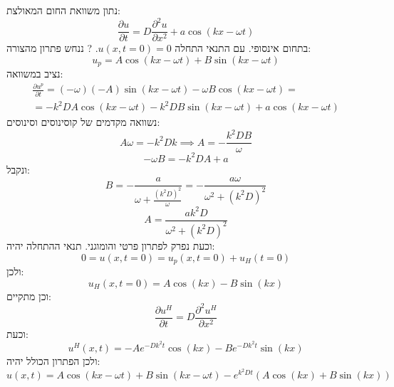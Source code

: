 \documentclass{tstextbook}
\begin{document}
נתון משוואת החום המאולצת:
$$\frac{\partial u}{\partial t}=D\frac{\partial ^2u}{\partial x^2}+a\cos\left( kx-\omega t \right)$$
בתחום אינסופי. עם התנאי התחלה \(u(x,t=0)=0\). 
?
ננחש פתרון מהצורה:
$$u_{p}=A\cos\left( kx-\omega t \right)+B\sin\left( kx-\omega t \right)$$
נציב במשוואה:
\begin{gather*}\frac{\partial u^p}{\partial t}=\left( -\omega  \right)(-A)\sin\left( kx-\omega t \right)-\omega B\cos\left( kx-\omega t \right)= \\=-k^2DA\cos\left( kx-\omega t \right)-k^2DB\sin\left( kx-\omega t \right) +a\cos\left( kx-\omega t \right)
\end{gather*}
נשוואה מקדמים של קוסינוסים וסינוסים:
$$A\omega=-k^2Dk\implies A=-\frac{k^2DB}{\omega}$$$$-\omega B = -k^2DA+a$$
ונקבל:
$$B=-\frac{a}{\omega+\frac{(k^2D)^2}{\omega}}=-\frac{a\omega}{\omega^2+(k^2D)^2}$$$$A=\frac{ak^2D}{\omega^2+(k^2D)^2}$$
וכעת נפרק לפתרון פרטי והומוגני. תנאי ההתחלה יהיה:
$$0=u(x,t=0)=u_{p}(x,t=0)+u_{H}(t=0)$$
ולכן:
$$u_{H}(x,t=0)=A\cos(kx)-B\sin(kx)$$
וכן מתקיים:
$$\frac{\partial u^H}{\partial t}=D\frac{\partial^2 u^H}{\partial x^2}$$
וכעת:
$$u^{H}(x,t)=-Ae^{-Dk^2t}\cos(kx)-Be^{-Dk^2t}\sin(kx)$$
ולכן הפתרון הכולל יהיה:
$$u(x,t)=A\cos\left( kx - \omega t \right)+B\sin\left( kx-\omega t \right)-e^{k^2Dt}\left( A\cos(kx)+B\sin(kx) \right)$$
\end{document}
